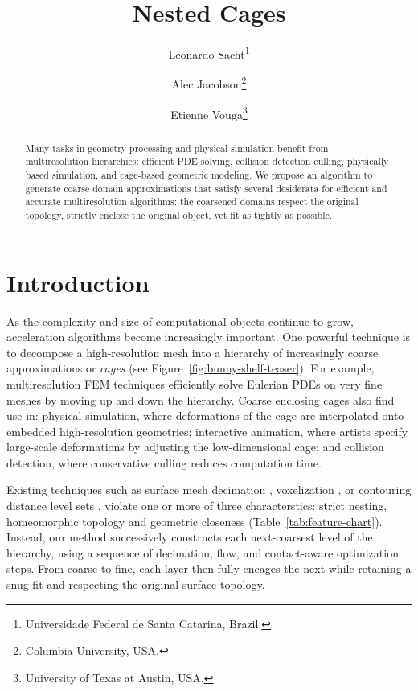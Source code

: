 \documentclass{cgyrf15}
\title{Nested Cages}
\author{
Leonardo Sacht\thanks{Universidade Federal de Santa Catarina, Brazil.} \and
Alec Jacobson\thanks{Columbia University, USA.} \and
Etienne Vouga\thanks{University of Texas at Austin, USA.} 
}
\begin{document}
\maketitle

\begin{abstract}
Many tasks in geometry processing and physical simulation benefit from
multiresolution hierarchies: efficient PDE solving, collision detection
culling, physically based simulation, and cage-based geometric modeling. We
propose an algorithm to generate coarse domain approximations that satisfy
several desiderata for efficient and accurate multiresolution algorithms: the
coarsened domains respect the original topology, strictly enclose the original
object, yet fit as tightly as possible.
\end{abstract}

\section{Introduction}

As the complexity and size of computational objects continue to grow,
acceleration algorithms become increasingly important. One powerful technique
is to decompose a high-resolution mesh into a hierarchy of increasingly coarse
approximations or \emph{cages} (see Figure~\ref{fig:bunny-shelf-teaser}). For example,
multiresolution FEM techniques efficiently solve Eulerian PDEs on very fine
meshes by moving up and down the hierarchy.  Coarse enclosing cages also find
use in: physical simulation, where deformations of the cage are interpolated
onto embedded high-resolution geometries; interactive animation, where
artists specify large-scale deformations by adjusting the low-dimensional cage;
and collision detection, where conservative culling reduces computation
time. 

Existing techniques such as surface mesh decimation \cite{Hoppe:1996:PM}, 
voxelization \cite{Xian:2009}, or
contouring distance level sets \cite{Shen:2004:IAI}, violate one or more of three characterstics:
strict nesting, homeomorphic topology and geometric closeness
(Table~\ref{tab:feature-chart}).  Instead, our method successively constructs
each next-coarsest level of the hierarchy, using a sequence of decimation,
flow, and contact-aware optimization steps.  From coarse to fine, each layer
then fully encages the next while retaining a snug fit and respecting the
original surface topology.
\end{document}
